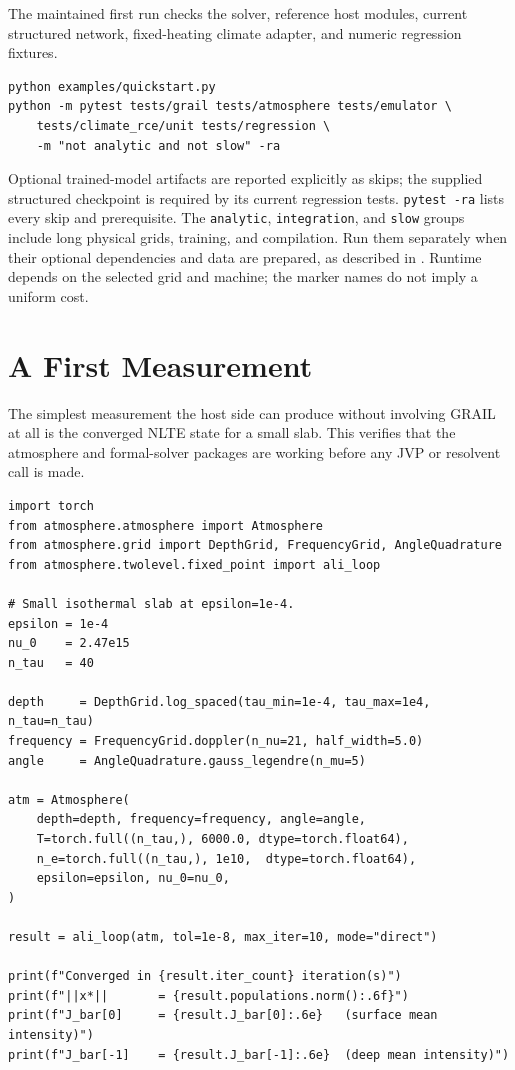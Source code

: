 The maintained first run checks the solver, reference host modules, current
structured network, fixed-heating climate adapter, and numeric regression fixtures.
\begin{lstlisting}[style=grailInStyle]
python examples/quickstart.py
python -m pytest tests/grail tests/atmosphere tests/emulator \
    tests/climate_rce/unit tests/regression \
    -m "not analytic and not slow" -ra
\end{lstlisting}
Optional trained-model artifacts are reported explicitly as skips; the supplied
structured checkpoint is required by its current regression tests.
\texttt{pytest -ra} lists every skip and prerequisite.
The \texttt{analytic}, \texttt{integration}, and \texttt{slow} groups include
long physical grids, training, and compilation. Run them separately when their
optional dependencies and data are prepared, as described in .
Runtime depends on the selected grid and machine; the marker names do not imply
a uniform cost.

\section{A First Measurement}
\label{sec:first-measurement}

The simplest measurement the host side can produce without involving GRAIL
at all is the converged NLTE state for a small slab.
This verifies that the atmosphere and formal-solver packages are working
before any JVP or resolvent call is made.

\begin{lstlisting}[style=grailInStyle]
import torch
from atmosphere.atmosphere import Atmosphere
from atmosphere.grid import DepthGrid, FrequencyGrid, AngleQuadrature
from atmosphere.twolevel.fixed_point import ali_loop

# Small isothermal slab at epsilon=1e-4.
epsilon = 1e-4
nu_0    = 2.47e15
n_tau   = 40

depth     = DepthGrid.log_spaced(tau_min=1e-4, tau_max=1e4, n_tau=n_tau)
frequency = FrequencyGrid.doppler(n_nu=21, half_width=5.0)
angle     = AngleQuadrature.gauss_legendre(n_mu=5)

atm = Atmosphere(
    depth=depth, frequency=frequency, angle=angle,
    T=torch.full((n_tau,), 6000.0, dtype=torch.float64),
    n_e=torch.full((n_tau,), 1e10,  dtype=torch.float64),
    epsilon=epsilon, nu_0=nu_0,
)

result = ali_loop(atm, tol=1e-8, max_iter=10, mode="direct")

print(f"Converged in {result.iter_count} iteration(s)")
print(f"||x*||       = {result.populations.norm():.6f}")
print(f"J_bar[0]     = {result.J_bar[0]:.6e}   (surface mean intensity)")
print(f"J_bar[-1]    = {result.J_bar[-1]:.6e}  (deep mean intensity)")
\end{lstlisting}

